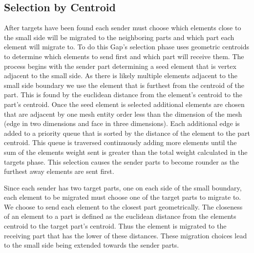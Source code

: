 \documentclass{thesis}
\begin{document}
\subsection{Selection by Centroid}
After targets have been found each sender must choose which elements close 
to the small side will be migrated to the neighboring parts and which part 
each element will migrate to. To do this Gap's selection phase uses geometric 
centroids to determine which elements to send first and which part will 
receive them. The process begins with the sender part determining a seed 
element that is vertex adjacent to the small side. As there is likely 
multiple elements adjacent to the small side boundary we use the element 
that is furthest from the centroid of the part. This is found by the euclidean 
distance from the element's centroid to the part's centroid. Once the seed 
element is selected additional elements are chosen that 
are adjacent by one mesh entity order less than the dimension of the mesh 
(edge in two dimensions and face in three dimensions). Each additional edge 
is added to a priority queue that is sorted by the distance of the element 
to the part centroid. This queue is traversed continuously adding more 
elements until the sum of the elements weight sent is greater than the total 
weight calculated in the targets phase. This selection causes the sender 
parts to become rounder as the furthest away elements are sent first.

Since each sender has two target parts, one on each side of the small 
boundary, each element to be migrated must choose one of the target parts to 
migrate to. We choose to send each element to the closest part geometrically. 
The closeness of an element to a part is defined as the euclidean distance 
from the elements centroid to the target part's centroid. Thus the element 
is migrated to the receiving part that has the lower of these distances. 
These migration choices lead to the small side being extended towards the 
sender parts. 
\end{document}
